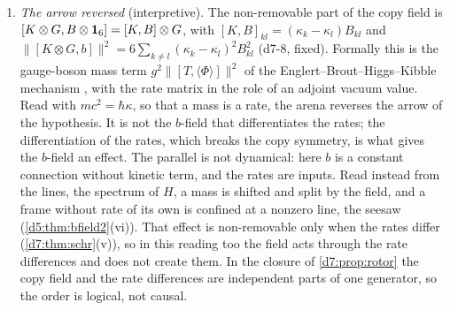 \begin{remark}
\begin{enumerate}[label=(\alph*),leftmargin=2.2em]
(\cref{d7:prop:exist,d7:prop:isospin,d7:prop:so4unequal}). This does not extend to four manifolds. There the binding-compatible copy rotations under a common
action form $\so4\cong\su2\oplus\su2$, the copy index is its vector $(\tfrac12,\tfrac12)$, and doublets exist without a spectator (d7-6d).
\item \emph{The arrow reversed} (interpretive). The non-removable part of the copy field is $[K\otimes G,B\otimes\mathbf 1_6]=[K,B]\otimes G$, with
$[K,B]_{kl}=(\kappa_k-\kappa_l)B_{kl}$ and $\|[K\otimes G,b]\|^2=6\sum_{k\neq l}(\kappa_k-\kappa_l)^2B_{kl}^2$ (d7-8, fixed). Formally this is the gauge-boson
mass term $g^2\|[T,\langle\Phi\rangle]\|^2$ of the Englert--Brout--Higgs--Kibble mechanism \cite{EnglertBrout64,Higgs64,Kibble67}, with the rate matrix
in the role of an adjoint vacuum value. Read with $mc^2=\hbar\kappa$, so that a mass is a rate, the arena reverses the arrow of the hypothesis. It is not the $b$-field that differentiates the rates;
the differentiation of the rates, which breaks the copy symmetry, is what gives the $b$-field an effect. The parallel is not dynamical: here $b$ is a
constant connection without kinetic term, and the rates are inputs. Read instead from the lines, the spectrum of $H$, a mass is shifted and split by the field, and a frame without rate of its own is confined at a nonzero line, the seesaw (\cref{d5:thm:bfield2}(vi)). That effect is non-removable only when the rates differ (\cref{d7:thm:schr}(v)), so in this reading too the field acts through the rate differences and does not create them. In the closure of \cref{d7:prop:rotor} the copy field and the rate differences are independent parts of one generator, so the order is logical, not causal.
\end{enumerate}
\end{remark}

